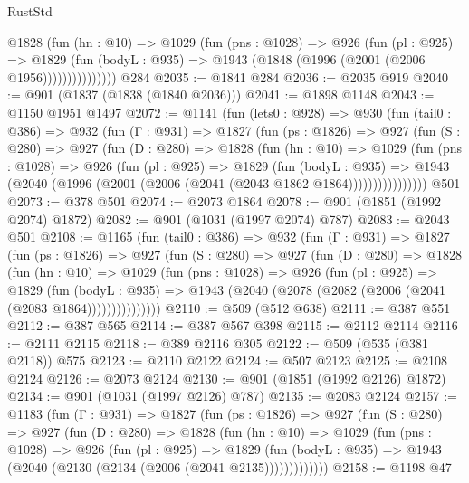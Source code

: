 \begin{lexlean}{RustStd}
\begin{coremodule}
                @1828
                  (fun (hn : @10) =>
                  @1029
                    (fun (pns : @1028) =>
                    @926
                      (fun (pl : @925) =>
                      @1829
                        (fun (bodyL : @935) =>
                        @1943 (@1848 (@1996 (@2001 (@2006 @1956)))))))))))))))
    @284
@2035 := @1841 @284
@2036 := @2035 @919
@2040 := @901 (@1837 (@1838 (@1840 @2036)))
@2041 := @1898 @1148
@2043 := @1150 @1951 @1497
@2072 := @1141
    (fun (lets0 : @928) =>
    @930
      (fun (tail0 : @386) =>
      @932
        (fun (Γ : @931) =>
        @1827
          (fun (ps : @1826) =>
          @927
            (fun (S : @280) =>
            @927
              (fun (D : @280) =>
              @1828
                (fun (hn : @10) =>
                @1029
                  (fun (pns : @1028) =>
                  @926
                    (fun (pl : @925) =>
                    @1829
                      (fun (bodyL : @935) =>
                      @1943 (@2040 (@1996 (@2001 (@2006 (@2041 (@2043 @1862 @1864))))))))))))))))
    @501
@2073 := @378 @501
@2074 := @2073 @1864
@2078 := @901 (@1851 (@1992 @2074) @1872)
@2082 := @901 (@1031 (@1997 @2074) @787)
@2083 := @2043 @501
@2108 := @1165
    (fun (tail0 : @386) =>
    @932
      (fun (Γ : @931) =>
      @1827
        (fun (ps : @1826) =>
        @927
          (fun (S : @280) =>
          @927
            (fun (D : @280) =>
            @1828
              (fun (hn : @10) =>
              @1029
                (fun (pns : @1028) =>
                @926
                  (fun (pl : @925) =>
                  @1829
                    (fun (bodyL : @935) =>
                    @1943 (@2040 (@2078 (@2082 (@2006 (@2041 (@2083 @1864)))))))))))))))
@2110 := @509 (@512 @638)
@2111 := @387 @551
@2112 := @387 @565
@2114 := @387 @567 @398
@2115 := @2112 @2114
@2116 := @2111 @2115
@2118 := @389 @2116 @305
@2122 := @509 (@535 (@381 @2118)) @575
@2123 := @2110 @2122
@2124 := @507 @2123
@2125 := @2108 @2124
@2126 := @2073 @2124
@2130 := @901 (@1851 (@1992 @2126) @1872)
@2134 := @901 (@1031 (@1997 @2126) @787)
@2135 := @2083 @2124
@2157 := @1183
    (fun (Γ : @931) =>
    @1827
      (fun (ps : @1826) =>
      @927
        (fun (S : @280) =>
        @927
          (fun (D : @280) =>
          @1828
            (fun (hn : @10) =>
            @1029
              (fun (pns : @1028) =>
              @926
                (fun (pl : @925) =>
                @1829
                  (fun (bodyL : @935) => @1943 (@2040 (@2130 (@2134 (@2006 (@2041 @2135)))))))))))))
@2158 := @1198 @47

\end{coremodule}
\end{lexlean}
